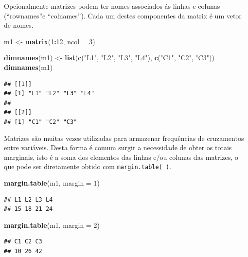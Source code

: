 \documentclass[]{book}
\newenvironment{Shaded}{\begin{snugshade}}{\end{snugshade}}
\newcommand{\DataTypeTok}[1]{\textcolor[rgb]{0.13,0.29,0.53}{#1}}
\newcommand{\DecValTok}[1]{\textcolor[rgb]{0.00,0.00,0.81}{#1}}
\newcommand{\KeywordTok}[1]{\textcolor[rgb]{0.13,0.29,0.53}{\textbf{#1}}}
\newcommand{\NormalTok}[1]{#1}
\newcommand{\OperatorTok}[1]{\textcolor[rgb]{0.81,0.36,0.00}{\textbf{#1}}}
\newcommand{\StringTok}[1]{\textcolor[rgb]{0.31,0.60,0.02}{#1}}
\begin{document}
Opcionalmente matrizes podem ter nomes associados ás linhas e colunas (``rownames''e ``colnames''). Cada um destes componentes da matrix é um vetor de nomes.

\begin{Shaded}
\begin{Highlighting}[]
\NormalTok{m1 <-}\StringTok{ }\KeywordTok{matrix}\NormalTok{(}\DecValTok{1}\OperatorTok{:}\DecValTok{12}\NormalTok{, }\DataTypeTok{ncol =} \DecValTok{3}\NormalTok{) }

\KeywordTok{dimnames}\NormalTok{(m1) <-}\StringTok{ }\KeywordTok{list}\NormalTok{(}\KeywordTok{c}\NormalTok{(}\StringTok{"L1"}\NormalTok{, }\StringTok{"L2"}\NormalTok{, }\StringTok{"L3"}\NormalTok{, }\StringTok{"L4"}\NormalTok{), }\KeywordTok{c}\NormalTok{(}\StringTok{"C1"}\NormalTok{, }\StringTok{"C2"}\NormalTok{, }\StringTok{"C3"}\NormalTok{)) }
\KeywordTok{dimnames}\NormalTok{(m1)}
\end{Highlighting}
\end{Shaded}

\begin{verbatim}
## [[1]]
## [1] "L1" "L2" "L3" "L4"
## 
## [[2]]
## [1] "C1" "C2" "C3"
\end{verbatim}

Matrizes são muitas vezes utilizadas para armazenar frequências de cruzamentos entre variáveis. Desta forma é comum surgir a necessidade de obter os totais marginais, isto é a soma dos elementos das linhas e/ou colunas das matrizes, o que pode ser diretamente obtido com \texttt{margin.table(\ )}.

\begin{Shaded}
\begin{Highlighting}[]
 \KeywordTok{margin.table}\NormalTok{(m1, }\DataTypeTok{margin =} \DecValTok{1}\NormalTok{)}
\end{Highlighting}
\end{Shaded}

\begin{verbatim}
## L1 L2 L3 L4 
## 15 18 21 24
\end{verbatim}

\begin{Shaded}
\begin{Highlighting}[]
 \KeywordTok{margin.table}\NormalTok{(m1, }\DataTypeTok{margin =} \DecValTok{2}\NormalTok{)}
\end{Highlighting}
\end{Shaded}

\begin{verbatim}
## C1 C2 C3 
## 10 26 42
\end{verbatim}
\end{document}

